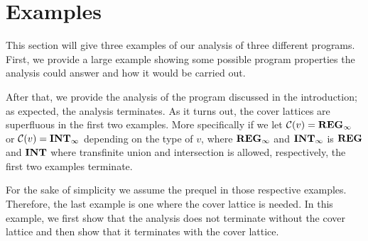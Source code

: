 \section{Examples}\label{sec:example}
This section will give three examples of our analysis of three different programs.
First, we provide a large example showing some possible program properties the analysis could answer and how it would be carried out.

After that, we provide the analysis of the program discussed in the introduction; as expected, the analysis terminates.
As it turns out, the cover lattices are superfluous in the first two examples.
More specifically if we let $\mathcal{C}(v) = \mathbf{REG}_{\infty}$ or $\mathcal{C}(v) = \mathbf{INT}_{\infty}$ depending on the type of $v$, where $\mathbf{REG}_{\infty}$ and $\mathbf{INT}_{\infty}$ is $\mathbf{REG}$ and $\mathbf{INT}$ where transfinite union and intersection is allowed, respectively, the first two examples terminate.

For the sake of simplicity we assume the prequel in those respective examples.
Therefore, the last example is one where the cover lattice is needed.
In this example, we first show that the analysis does not terminate without the cover lattice and then show that it terminates with the cover lattice.





